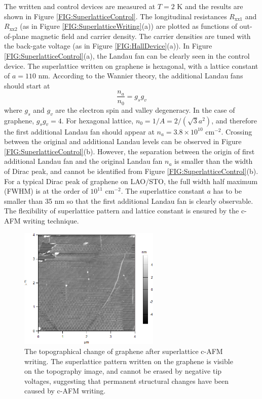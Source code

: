 \documentclass[pdflatex, sectionletters, 12pt, final, phd]{pittetd}    %
\begin{document}
The written and control devices are measured at $T = 2$ K and the results are shown in Figure \ref{FIG:SuperlatticeControl}. The longitudinal resistances $R_\mathrm{xx1}$ and $R_\mathrm{xx2}$ (as in Figure \ref{FIG:SuperlatticeWriting}(a)) are plotted as functions of out-of-plane magnetic field and carrier density. The carrier densities are tuned with the back-gate voltage (as in Figure \ref{FIG:HallDevice}(a)). In Figure \ref{FIG:SuperlatticeControl}(a), the Landau fan can be clearly seen in the control device. The superlattice written on graphene is hexagonal, with a lattice constant of $a = 110$ nm. According to the Wannier theory, the additional Landau fans should start at\cite{dean2013hofstadter} 
$$
\frac{n_a}{n_0} = g_s g_v
$$
where $g_s$ and $g_v$ are the electron spin and valley degeneracy. In the case of graphene, $g_s g_v = 4$. For hexagonal lattice, $n_0 = 1/A = 2 / (\sqrt{3} a^2)$, and therefore the first additional Landau fan should appear at $n_a = 3.8 \times 10^{10}$ cm$^{-2}$. Crossing between the original and additional Landau levels can be observed in Figure \ref{FIG:SuperlatticeControl}(b). However, the separation between the origin of first additional Landau fan and the original Landau fan $n_a$ is smaller than the width of Dirac peak, and cannot be identified from Figure \ref{FIG:SuperlatticeControl}(b). For a typical Dirac peak of graphene on LAO/STO, the full width half maximum (FWHM) is at the order of $10^{11}$ cm$^{-2}$. The superlattice constant $a$ has to be smaller than 35 nm so that the first additional Landau fan is clearly observable. The flexibility of superlattice pattern and lattice constant is ensured by the c-AFM writing technique. 

\begin{figure}[h!]
	\centering
	\vspace{0.85cm}
	\includegraphics[width=0.6\textwidth]{Drawing/SuperlatticeDamage.png}
	\caption[The topographical change of graphene after superlattice c-AFM writing]{The topographical change of graphene after superlattice c-AFM writing. The superlattice pattern written on the graphene is visible on the topography image, and cannot be erased by negative tip voltages, suggesting that permanent structural changes have been caused by c-AFM writing.}
	\label{FIG:SuperlatticeDamage}
\end{figure}
\end{document}

